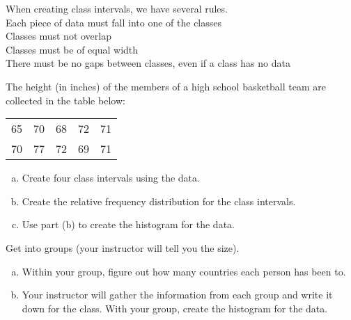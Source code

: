 \documentclass[notes]{subfiles}
\begin{document}
		\begin{rmk}
			When creating class intervals, we have several rules.\\[15pt]

			\tabitem Each piece of data must fall into one of the classes\\[15pt]
			\tabitem Classes must not overlap\\[15pt]
			\tabitem Classes must be of equal width\\[15pt]
			\tabitem There must be no gaps between classes, even if a class has no data
		\end{rmk}
			\newpage

		\begin{ex}
			The height (in inches) of the members of a high school basketball team are collected in the table below:
			\begin{center}
				\begin{tabular}{lllll}
					65&70&68&72&71\\
					70&77&72&69&71
				\end{tabular}
			\end{center}
			\begin{enumerate}[(a)]
				\item Create four class intervals using the data.%

				\item Create the relative frequency distribution for the class intervals.%

				\item Use part (b) to create the histogram for the data.%
			\end{enumerate}
		\end{ex}
			\newpage

		\begin{ex}
			Get into groups (your instructor will tell you the size).%
			\begin{enumerate}[(a)]
				\item Within your group, figure out how many countries each person has been to.%
					\vs{1}

				\item Your instructor will gather the information from each group and write it down for the class.  With your group, create the histogram for the data.%
					\vs{2}

			\end{enumerate}
		\end{ex}
			\newpage
\end{document}
